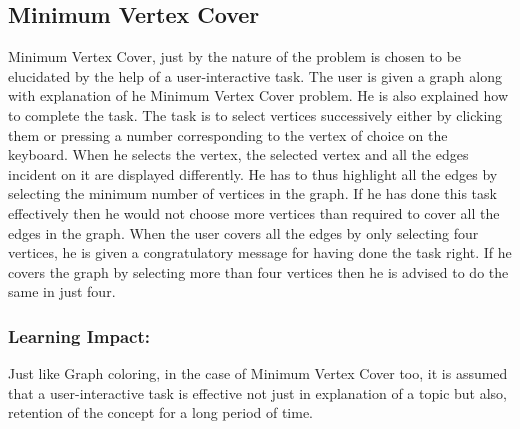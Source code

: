 \subsection{Minimum Vertex Cover}
Minimum Vertex Cover, just by the nature of the problem is chosen to be
elucidated by the help of a user-interactive task. The user is given a graph
along with explanation of he Minimum Vertex Cover problem. He is also explained
how to complete the task. The task is to select vertices successively either by
clicking them or pressing a number corresponding to the vertex of choice on the
keyboard.  When he selects the vertex, the selected vertex and all the edges
incident on it are displayed differently. He has to thus highlight all the
edges by selecting the minimum number of vertices in the graph.  If he has done
this task effectively then he would not choose more vertices than required to
cover all the edges in the graph. When the user covers all the edges by only
selecting four vertices, he is given a congratulatory message for having done
the task right. If he covers the graph by selecting more than four vertices
then he is advised to do the same in just four.

\subsubsection{Learning Impact:}
Just like Graph coloring, in the case of Minimum Vertex Cover too, it is
assumed that a user-interactive task is effective not just in explanation of a
topic but also, retention of the concept for a long period of time.
